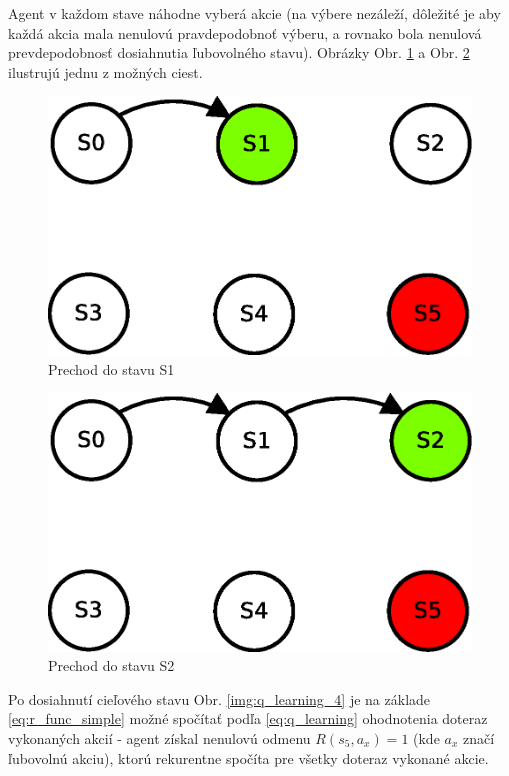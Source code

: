 Agent v každom stave náhodne vyberá akcie (na výbere nezáleží, dôležité je aby
každá akcia mala nenulovú pravdepodobnoť výberu, a rovnako bola nenulová
prevdepodobnosť dosiahnutia ľubovolného stavu). Obrázky Obr. \ref{img:q_learning_2}
a Obr. \ref{img:q_learning_3} ilustrujú jednu z možných ciest.


\begin{figure}[!htb]
\center
\includegraphics[scale=.6]{../diagrams/q_learning_table_02.eps}
\caption{Prechod do stavu S1}
\label{img:q_learning_2}
\end{figure}

\begin{figure}[!htb]
\center
\includegraphics[scale=.6]{../diagrams/q_learning_table_03.eps}
\caption{Prechod do stavu S2}
\label{img:q_learning_3}
\end{figure}

Po dosiahnutí cieľového stavu Obr. \ref{img:q_learning_4} je na základe \ref{eq:r_func_simple}
možné spočítať podľa \ref{eq:q_learning} ohodnotenia doteraz vykonaných akcií -
agent získal nenulovú odmenu $R(s_5, a_x) = 1$ (kde $a_x$ značí ľubovolnú akciu),
ktorú rekurentne spočíta pre všetky doteraz vykonané akcie.

